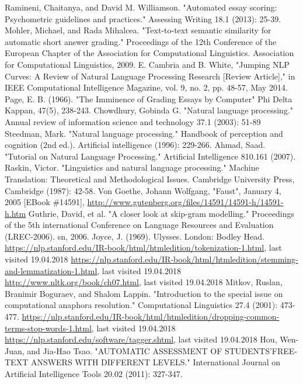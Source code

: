 \documentclass[rnd]{mas_report}
\begin{document}
\begin{thebibliography}{3}
 Ramineni, Chaitanya, and David M. Williamson. "Automated essay scoring: Psychometric guidelines and practices." Assessing Writing 18.1 (2013): 25-39. 
 Mohler, Michael, and Rada Mihalcea. "Text-to-text semantic similarity for automatic short answer grading." Proceedings of the 12th Conference of the European Chapter of the Association for Computational Linguistics. Association for Computational Linguistics, 2009.
 E. Cambria and B. White, "Jumping NLP Curves: A Review of Natural Language Processing Research [Review Article]," in IEEE Computational Intelligence Magazine, vol. 9, no. 2, pp. 48-57, May 2014.
  Page, E. B. (1966). "The Imminence of Grading Essays by Computer" Phi Delta Kappan, 47(5), 238-243.
 Chowdhury, Gobinda G. "Natural language processing." Annual review of information science and technology 37.1 (2003): 51-89
 Steedman, Mark. "Natural language processing." Handbook of perception and cognition (2nd ed.). Artificial intelligence (1996): 229-266.
 Ahmad, Saad. "Tutorial on Natural Language Processing." Artificial Intelligence 810.161 (2007).
  Raskin, Victor. "Linguistics and natural language processing." Machine Translation: Theoretical and Methodological Issues. Cambridge University Press, Cambridge (1987): 42-58.
 Von Goethe, Johann Wolfgang, "Faust", January 4, 2005 [EBook \#14591], \url{http://www.gutenberg.org/files/14591/14591-h/14591-h.htm}
 Guthrie, David, et al. "A closer look at skip-gram modelling." Proceedings of the 5th international Conference on Language Resources and Evaluation (LREC-2006). sn, 2006.
 Joyce, J. (1969). Ulysses. London: Bodley Head.
 \url{https://nlp.stanford.edu/IR-book/html/htmledition/tokenization-1.html}, last visited 19.04.2018
 \url{https://nlp.stanford.edu/IR-book/html/htmledition/stemming-and-lemmatization-1.html}, last visited 19.04.2018
 \url{http://www.nltk.org/book/ch07.html}, last visited 19.04.2018
 Mitkov, Ruslan, Branimir Boguraev, and Shalom Lappin. "Introduction to the special issue on computational anaphora resolution." Computational Linguistics 27.4 (2001): 473-477.
 \url{https://nlp.stanford.edu/IR-book/html/htmledition/dropping-common-terms-stop-words-1.html}, last visited 19.04.2018
 \url{https://nlp.stanford.edu/software/tagger.shtml}, last visited 19.04.2018
 Hou, Wen-Juan, and Jia-Hao Tsao. "AUTOMATIC ASSESSMENT OF STUDENTS'FREE-TEXT ANSWERS WITH DIFFERENT LEVELS." International Journal on Artificial Intelligence Tools 20.02 (2011): 327-347.

\end{thebibliography}
\end{document}
